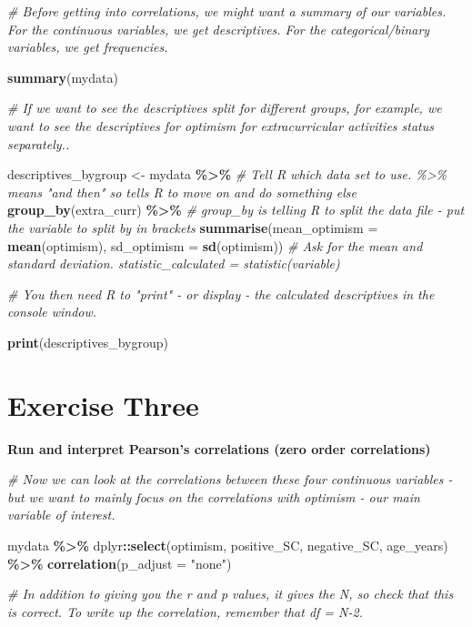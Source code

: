 \documentclass[
]{book}
\newenvironment{Shaded}{\begin{snugshade}}{\end{snugshade}}
\newcommand{\AttributeTok}[1]{\textcolor[rgb]{0.13,0.29,0.53}{#1}}
\newcommand{\CommentTok}[1]{\textcolor[rgb]{0.56,0.35,0.01}{\textit{#1}}}
\newcommand{\FunctionTok}[1]{\textcolor[rgb]{0.13,0.29,0.53}{\textbf{#1}}}
\newcommand{\NormalTok}[1]{#1}
\newcommand{\OtherTok}[1]{\textcolor[rgb]{0.56,0.35,0.01}{#1}}
\newcommand{\SpecialCharTok}[1]{\textcolor[rgb]{0.81,0.36,0.00}{\textbf{#1}}}
\newcommand{\StringTok}[1]{\textcolor[rgb]{0.31,0.60,0.02}{#1}}
\let\oldsection\section
\renewcommand{\section}{\needspace{5\baselineskip}\oldsection}
\begin{document}
\begin{Shaded}
\begin{Highlighting}[]
\CommentTok{\# Before getting into correlations, we might want a summary of our variables. For the continuous variables, we get descriptives. For the categorical/binary variables, we get frequencies.}

\FunctionTok{summary}\NormalTok{(mydata)}

\CommentTok{\# If we want to see the descriptives split for different groups, for example, we want to see the descriptives for optimism for extracurricular activities status separately..}

\NormalTok{descriptives\_bygroup }\OtherTok{\textless{}{-}}\NormalTok{ mydata }\SpecialCharTok{\%\textgreater{}\%} \CommentTok{\# Tell R which data set to use.  \%\textgreater{}\% means "and then" so tells R to move on and do something else}
  \FunctionTok{group\_by}\NormalTok{(extra\_curr) }\SpecialCharTok{\%\textgreater{}\%} \CommentTok{\# group\_by is telling R to split the data file {-} put the variable to split by in brackets}
  \FunctionTok{summarise}\NormalTok{(}\AttributeTok{mean\_optimism =} \FunctionTok{mean}\NormalTok{(optimism), }\AttributeTok{sd\_optimism =} \FunctionTok{sd}\NormalTok{(optimism)) }\CommentTok{\# Ask for the mean and standard deviation. statistic\_calculated = statistic(variable)}

\CommentTok{\# You then need R to "print" {-} or display {-} the calculated descriptives in the console window.}

\FunctionTok{print}\NormalTok{(descriptives\_bygroup)}
\end{Highlighting}
\end{Shaded}

\section{Exercise Three}\label{exercise-three-1}

\textbf{Run and interpret Pearson's correlations (zero order correlations)}

\begin{Shaded}
\begin{Highlighting}[]
\CommentTok{\# Now we can look at the correlations between these four continuous variables {-} but we want to mainly focus on the correlations with optimism {-} our main variable of interest.}

\NormalTok{mydata }\SpecialCharTok{\%\textgreater{}\%}
\NormalTok{  dplyr}\SpecialCharTok{::}\FunctionTok{select}\NormalTok{(optimism, positive\_SC, negative\_SC, age\_years) }\SpecialCharTok{\%\textgreater{}\%}
  \FunctionTok{correlation}\NormalTok{(}\AttributeTok{p\_adjust =} \StringTok{"none"}\NormalTok{)}

\CommentTok{\# In addition to giving you the r and p values, it gives the N, so check that this is correct. To write up the correlation, remember that df = N{-}2.}
\end{Highlighting}
\end{Shaded}
\end{document}

